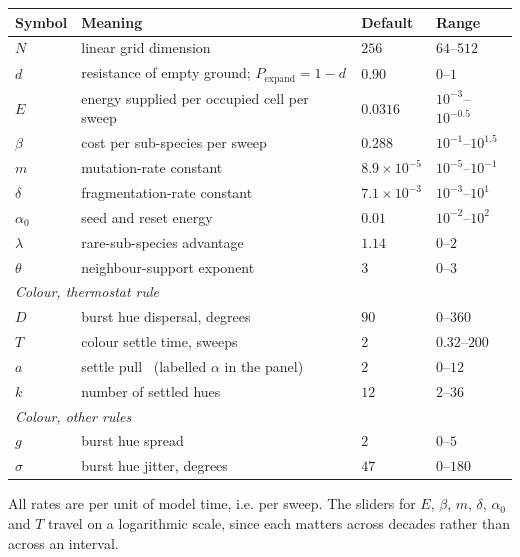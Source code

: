 \documentclass[11pt,a4paper]{article}
\begin{document}
\begin{center}
\begin{tabular}{llll}
\toprule
Symbol & Meaning & Default & Range \\
\midrule
$N$          & linear grid dimension                     & $256$      & $64$--$512$ \\
$d$          & resistance of empty ground; $P_{\text{expand}} = 1-d$ & $0.90$ & $0$--$1$ \\
$E$          & energy supplied per occupied cell per sweep & $0.0316$ & $10^{-3}$--$10^{-0.5}$ \\
$\beta$      & cost per sub-species per sweep            & $0.288$    & $10^{-1}$--$10^{1.5}$ \\
$m$          & mutation-rate constant                    & $8.9\times10^{-5}$ & $10^{-5}$--$10^{-1}$ \\
$\delta$     & fragmentation-rate constant               & $7.1\times10^{-3}$ & $10^{-3}$--$10^{1}$ \\
$\alpha_0$   & seed and reset energy                     & $0.01$     & $10^{-2}$--$10^{2}$ \\
$\lambda$    & rare-sub-species advantage                & $1.14$     & $0$--$2$ \\
$\theta$     & neighbour-support exponent                & $3$        & $0$--$3$ \\
\midrule
\multicolumn{4}{l}{\emph{Colour, thermostat rule}} \\
$D$          & burst hue dispersal, degrees              & $90$       & $0$--$360$ \\
$T$          & colour settle time, sweeps                & $2$        & $0.32$--$200$ \\
$a$          & settle pull \ (labelled $\alpha$ in the panel) & $2$        & $0$--$12$ \\
$k$          & number of settled hues                    & $12$       & $2$--$36$ \\
\midrule
\multicolumn{4}{l}{\emph{Colour, other rules}} \\
$g$          & burst hue spread                          & $2$        & $0$--$5$ \\
$\sigma$     & burst hue jitter, degrees                 & $47$       & $0$--$180$ \\
\bottomrule
\end{tabular}
\end{center}

\noindent
All rates are per unit of model time, i.e. per sweep. The sliders for $E$, $\beta$, $m$,
$\delta$, $\alpha_0$ and $T$ travel on a logarithmic scale, since each matters across
decades rather than across an interval.
\end{document}
